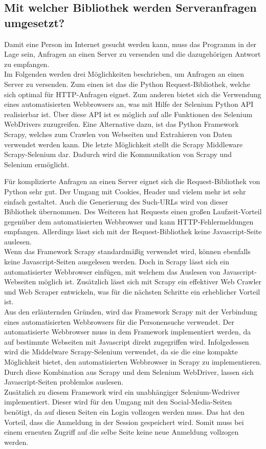 			
		
		\subsection{Mit welcher Bibliothek werden Serveranfragen umgesetzt?}
		Damit eine Person im Internet gesucht werden kann, muss das Programm in der Lage sein, Anfragen an einen Server zu versenden und die dazugehörigen Antwort zu empfangen. \\
		Im Folgenden werden drei Möglichkeiten beschrieben, um Anfragen an einen Server zu versenden. Zum einen ist das die Python Request-Bibliothek, welche sich optimal für HTTP-Anfragen eignet.\cite{WebScraping} Zum anderen bietet sich die Verwendung eines automatisierten Webbrowsers an, was mit Hilfe der Selenium Python API realisierbar ist.\cite{lawson2015web} Über diese API ist es möglich auf alle Funktionen des Selenium WebDrivers zuzugreifen.\cite{SeleniumWithPython} Eine Alternative dazu, ist das Python Framework Scrapy, welches zum Crawlen von Webseiten und Extrahieren von Daten verwendet werden kann.\cite{Scrapy} Die letzte Möglichkeit stellt die  Scrapy Middleware Scrapy-Selenium dar.\cite{scrapy-selenium} Dadurch wird die Kommunikation von Scrapy und Selenium ermöglicht.
		
		Für komplizierte Anfragen an einen Server eignet sich die Request-Bibliothek von Python sehr gut. Der Umgang mit Cookies, Header und vielem mehr ist sehr einfach gestaltet. Auch die Generierung des Such-URLs wird von dieser Bibliothek übernommen. Des Weiteren hat Requests einen großen Laufzeit-Vorteil gegenüber dem automatisierten Webbrowser und kann HTTP-Fehlermeldungen empfangen. Allerdings lässt sich mit der Request-Bibliothek keine Javascript-Seite auslesen.\\
		Wenn das Framework Scrapy standardmäßig verwendet wird, können ebenfalls keine Javascript-Seiten ausgelesen werden. Doch in Scrapy lässt sich ein automatisierter Webbrowser einfügen, mit welchem das Auslesen von Javascript-Webseiten möglich ist. Zusätzlich lässt sich mit Scrapy ein effektiver Web Crawler und Web Scraper entwickeln, was für die nächsten Schritte ein erheblicher Vorteil ist.\\
		Aus den erläuternden Gründen, wird das Framework Scrapy mit der Verbindung eines automatisierten Webbrowsers für die Personensuche verwendet. Der automatisierte Webbrowser muss in dem Framework implementiert werden, da auf bestimmte Webseiten mit Javascript direkt zugegriffen wird. Infolgedessen wird die Middelware Scrapy-Selenium verwendet, da sie die eine kompakte Möglichkeit bietet, den automatisierten Webbrowser in Scrapy zu implementieren. Durch diese Kombination aus Scrapy und dem Selenium WebDriver, lassen sich Javascript-Seiten problemlos auslesen. \\
		Zusätzlich zu diesem Framework wird ein unabhängiger Selenium-Wedriver implementiert. Dieser wird für den Umgang mit den Social-Media-Seiten benötigt, da auf diesen Seiten ein Login vollzogen werden muss. Das hat den Vorteil, dass die Anmeldung in der Session gespeichert wird. Somit muss bei einem erneuten Zugriff auf die selbe Seite keine neue Anmeldung vollzogen werden.
	
